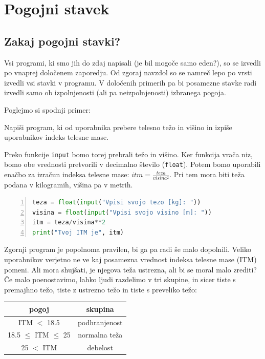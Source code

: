 \chapter{Pogojni stavek}

\section{Zakaj pogojni stavki?}

Vsi programi, ki smo jih do zdaj napisali (je bil mogoče samo eden?), so se izvedli po vnaprej določenem zaporedju. Od zgoraj navzdol so se namreč lepo po vrsti izvedli vsi stavki v programu. V določenih primerih pa bi posamezne stavke radi izvedli samo ob izpolnjenosti (ali pa neizpolnjenosti) izbranega pogoja. 

Poglejmo si spodnji primer:
\begin{zgled}
Napiši program, ki od uporabnika prebere telesno težo in višino in izpiše uporabnikov indeks telesne mase.
\end{zgled}
\begin{resitev}
Preko funkcije \texttt{input} bomo torej prebrali težo in višino. Ker funkcija vrača niz, bomo obe vrednosti pretvorili v decimalno število (\texttt{float}). Potem bomo uporabili enačbo za izračun indeksa telesne mase: $itm = \frac{teza}{visina^2}$. Pri tem mora biti teža podana v kilogramih, višina pa v metrih.
\begin{lstlisting}[language=Python,numbers=left]
teza = float(input("Vpisi svojo tezo [kg]: "))
visina = float(input("Vpisi svojo visino [m]: "))
itm = teza/visina**2
print("Tvoj ITM je", itm)
\end{lstlisting}
\end{resitev}

Zgornji program je popolnoma pravilen, bi ga pa radi še malo dopolnili. Veliko uporabnikov verjetno ne ve kaj posamezna vrednost indeksa telesne mase (ITM) pomeni. Ali mora shujšati, je njegova teža ustrezna, ali bi se moral malo zrediti? Če malo poenostavimo, lahko ljudi razdelimo v tri skupine, in sicer tiste s premajhno težo, tiste z ustrezno težo in tiste s preveliko težo:

\begin{tabular}{c|c}
     pogoj & skupina \\
     \hline
     ITM $<$ 18.5 & podhranjenost\\
     18.5 $\leq$ ITM $\leq$ 25 & normalna teža\\
     25 $<$ ITM & debelost
\end{tabular}

